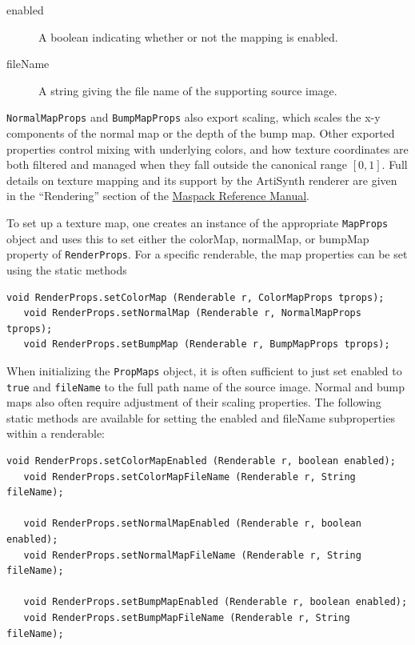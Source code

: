 \begin{description}

\item[enabled]\mbox{}

A boolean indicating whether or not the mapping is enabled.

\item[fileName]\mbox{}

A string giving the file name of the supporting source image.

\end{description}

{\tt NormalMapProps} and {\tt BumpMapProps} also export {\sf scaling},
which scales the x-y components of the normal map or the depth of the
bump map. Other exported properties control mixing with underlying
colors, and how texture coordinates are both filtered and managed when
they fall outside the canonical range $[0,1]$.  Full details on
texture mapping and its support by the ArtiSynth renderer are given in
the ``Rendering'' section of the \href{\artisynthDocBase/html/maspack/maspack.html}{Maspack
Reference Manual}.

To set up a texture map, one creates an instance of the appropriate
{\tt MapProps} object and uses this to set either the {\sf colorMap},
{\sf normalMap}, or {\sf bumpMap} property of {\tt RenderProps}.  
For a specific renderable, the map properties can be set
using the static methods
%
\begin{lstlisting}[]
   void RenderProps.setColorMap (Renderable r, ColorMapProps tprops);
   void RenderProps.setNormalMap (Renderable r, NormalMapProps tprops);
   void RenderProps.setBumpMap (Renderable r, BumpMapProps tprops);
\end{lstlisting}
%
When
initializing the {\tt PropMaps} object, it is often sufficient to just
set {\sf enabled} to {\tt true} and {\tt fileName} to the full path
name of the source image.  Normal and bump maps also often require
adjustment of their {\sf scaling} properties.  The following static
methods are available for setting the {\sf enabled} and
{\sf fileName} subproperties within a renderable:
%
\begin{lstlisting}[]
   void RenderProps.setColorMapEnabled (Renderable r, boolean enabled);
   void RenderProps.setColorMapFileName (Renderable r, String fileName);

   void RenderProps.setNormalMapEnabled (Renderable r, boolean enabled);
   void RenderProps.setNormalMapFileName (Renderable r, String fileName);

   void RenderProps.setBumpMapEnabled (Renderable r, boolean enabled);
   void RenderProps.setBumpMapFileName (Renderable r, String fileName);
\end{lstlisting}
%

